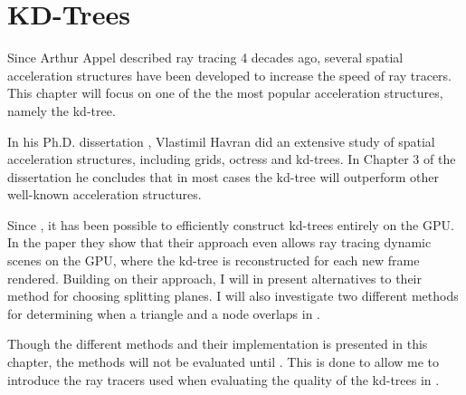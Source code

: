 \chapter{KD-Trees}\label{chp:kdTrees}






Since Arthur Appel described ray tracing 4 decades ago, several
spatial acceleration structures have been developed to increase the
speed of ray tracers. This chapter will focus on one of the the most
popular acceleration structures, namely the kd-tree.


In his Ph.D. dissertation , Vlastimil Havran did
an extensive study of spatial acceleration structures, including
grids, octress and kd-trees. In Chapter 3 of the dissertation he
concludes that in most cases the kd-tree will outperform other
well-known acceleration structures.


Since \zhou{}, it has been possible to efficiently construct kd-trees entirely
on the GPU. In the paper they show that their approach even allows ray tracing
dynamic scenes on the GPU, where the kd-tree is reconstructed for each new frame
rendered. Building on their approach, I will in 
present alternatives to their method for choosing splitting planes. I will also
investigate two different methods for determining when a triangle and a node
overlaps in .

Though the different methods and their implementation is presented in this
chapter, the methods will not be evaluated until . This
is done to allow me to introduce the ray tracers used when evaluating the
quality of the kd-trees in .


